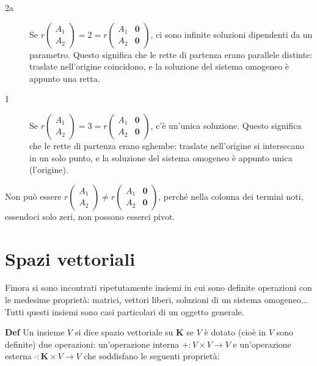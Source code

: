 \documentclass{article}
\begin{document}
\begin{description}
\item[2a] Se $r\left( 
\begin{array}{c}
A_{1} \\ 
A_{2}%
\end{array}%
\right) =2=r\left( 
\begin{array}{cc}
A_{1} & \mathbf{0} \\ 
A_{2} & \mathbf{0}%
\end{array}%
\right) $, ci sono infinite soluzioni dipendenti da un parametro. Questo
significa che le rette di partenza erano parallele distinte: traslate
nell'origine coincidono, e la soluzione del sistema omogeneo \`{e} appunto
una retta.

\item[1] Se $r\left( 
\begin{array}{c}
A_{1} \\ 
A_{2}%
\end{array}%
\right) =3=r\left( 
\begin{array}{cc}
A_{1} & \mathbf{0} \\ 
A_{2} & \mathbf{0}%
\end{array}%
\right) $, c'\`{e} un'unica soluzione. Questo significa che le rette di
partenza erano sghembe: traslate nell'origine si intersecano in un solo
punto, e la soluzione del sistema omogeneo \`{e} appunto unica (l'origine).
\end{description}

Non pu\`{o} essere $r\left( 
\begin{array}{c}
A_{1} \\ 
A_{2}%
\end{array}%
\right) \neq r\left( 
\begin{array}{cc}
A_{1} & \mathbf{0} \\ 
A_{2} & \mathbf{0}%
\end{array}%
\right) $, perch\'{e} nella colonna dei termini noti, essendoci solo zeri,
non possono esserci pivot.

\section{Spazi vettoriali}

Finora si sono incontrati ripetutamente insiemi in cui sono definite
operazioni con le medesime propriet\`{a}: matrici, vettori liberi, soluzioni
di un sistema omogeneo... Tutti questi insiemi sono casi particolari di un
oggetto generale.

\textbf{Def} Un insieme $V$ si dice spazio vettoriale su $\mathbf{K}$ se $V$ 
\`{e} dotato (cio\`{e} in $V$ sono definite) due operazioni: un'operazione
interna $+:V\times V\rightarrow V$ e un'operazione esterna $\cdot :\mathbf{K}%
\times V\rightarrow V$ che soddisfano le seguenti propriet\`{a}:
\end{document}
